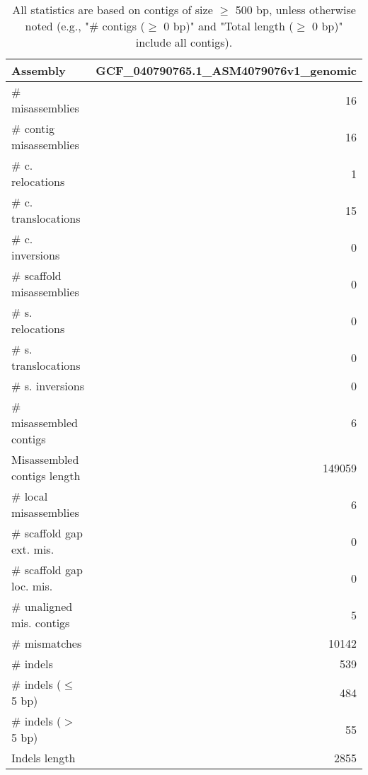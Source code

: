 \documentclass[12pt,a4paper]{article}
\begin{document}
\begin{table}[ht]
\begin{center}
\caption{All statistics are based on contigs of size $\geq$ 500 bp, unless otherwise noted (e.g., "\# contigs ($\geq$ 0 bp)" and "Total length ($\geq$ 0 bp)" include all contigs).}
\begin{tabular}{|l*{1}{|r}|}
\hline
Assembly & GCF\_040790765.1\_ASM4079076v1\_genomic \\ \hline
\# misassemblies & 16 \\ \hline
\hspace{2mm}\# contig misassemblies & 16 \\ \hline
\hspace{5mm}\# c. relocations & 1 \\ \hline
\hspace{5mm}\# c. translocations & 15 \\ \hline
\hspace{5mm}\# c. inversions & 0 \\ \hline
\hspace{2mm}\# scaffold misassemblies & 0 \\ \hline
\hspace{5mm}\# s. relocations & 0 \\ \hline
\hspace{5mm}\# s. translocations & 0 \\ \hline
\hspace{5mm}\# s. inversions & 0 \\ \hline
\# misassembled contigs & 6 \\ \hline
Misassembled contigs length & 149059 \\ \hline
\# local misassemblies & 6 \\ \hline
\# scaffold gap ext. mis. & 0 \\ \hline
\# scaffold gap loc. mis. & 0 \\ \hline
\# unaligned mis. contigs & 5 \\ \hline
\# mismatches & 10142 \\ \hline
\# indels & 539 \\ \hline
\hspace{5mm}\# indels ($\leq$ 5 bp) & 484 \\ \hline
\hspace{5mm}\# indels ($>$ 5 bp) & 55 \\ \hline
Indels length & 2855 \\ \hline
\end{tabular}
\end{center}
\end{table}
\end{document}
